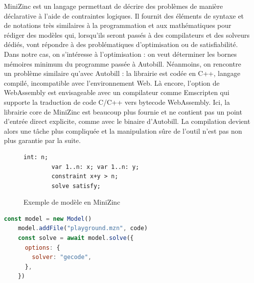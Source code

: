 \documentclass[12pt]{article}
\begin{document}
MiniZinc est un langage permettant de décrire des problèmes de manière déclarative à l'aide de contraintes logiques. Il fournit des éléments de syntaxe et de notations très similaires à la programmation et aux mathématiques pour rédiger des modèles qui, lorsqu'ils seront passés à des compilateurs et des solveurs dédiés, vont répondre à des problématiques d'optimisation ou de satisfiabilité. Dans notre cas, on s'intéresse à l'optimisation : on veut déterminer les bornes mémoires minimum du programme passée à Autobill.
Néanmoins, on rencontre un problème similaire qu'avec Autobill : la librairie est codée en C++, langage compilé, incompatible avec l'environnement Web. Là encore, l'option de WebAssembly est envisageable avec un compilateur comme Emscripten qui supporte la traduction de code C/C++ vers bytecode WebAssembly. Ici, la librairie core de MiniZinc est beaucoup plus fournie et ne contient pas un point d'entrée direct explicite, comme avec le binaire d'Autobill. La compilation devient alors une tâche plus compliquée et la manipulation sûre de l'outil n'est pas non plus garantie par la suite.
\begin{figure}[!b]
    \centering
    \begin{lstlisting}[language=minizinc]
        int: n;
        var 1..n: x; var 1..n: y;
        constraint x+y > n;
        solve satisfy;
    \end{lstlisting}
    \caption{Exemple de modèle en MiniZinc}
    \label{Simple modèle pour déterminer la satisfiabilité d'une équation}
\end{figure} \newpage
\begin{lstlisting}[language=javascript]
    const model = new Model()
    model.addFile("playground.mzn", code)
    const solve = await model.solve({
      options: {
        solver: "gecode",
      },
    })
\end{lstlisting}
\iffalse                            
\end{document}
